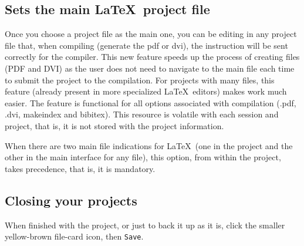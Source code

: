 \subsection{Sets the main \LaTeX ~project file}
Once you choose a project file as the main one, you can be editing in any project 
file that, when compiling (generate the pdf or dvi), the instruction will be sent correctly
for the compiler. This new feature speeds up the process of creating files (PDF and DVI) 
as the user does not need to navigate to the main file each time to submit the project 
to the compilation. For projects with many files, this feature (already present in more 
specialized \LaTeX ~editors) makes work much easier. The feature is functional for all options
associated with compilation (.pdf, .dvi, makeindex and bibitex). This resource is volatile
with each session and project, that is, it is not stored with the project information.

When there are two main file indications for \LaTeX ~(one in the project and the other in the main
interface for any file), this option, from within the project, takes precedence, that is, it is mandatory.

\subsection{Closing your projects}
When finished with the project, or just to back it up as it is, click the smaller yellow-brown file-card icon, 
then \texttt{Save}.
